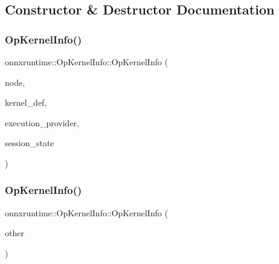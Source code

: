 \subsection{Constructor \& Destructor Documentation}
\mbox{\label{classonnxruntime_1_1OpKernelInfo_a6f4103663e7050bfe536c53526e42438}} 
\subsubsection{\texorpdfstring{Op\+Kernel\+Info()}{OpKernelInfo()}\hspace{0.1cm}{\footnotesize\ttfamily [1/2]}}
{\footnotesize\ttfamily onnxruntime\+::\+Op\+Kernel\+Info\+::\+Op\+Kernel\+Info (\begin{DoxyParamCaption}\item[{const \mbox{\hyperlink{classonnxruntime_1_1Node}{onnxruntime\+::\+Node}} \&}]{node,  }\item[{const \mbox{\hyperlink{classonnxruntime_1_1KernelDef}{Kernel\+Def}} \&}]{kernel\+\_\+def,  }\item[{const \mbox{\hyperlink{classonnxruntime_1_1IExecutionProvider}{I\+Execution\+Provider}} \&}]{execution\+\_\+provider,  }\item[{const \mbox{\hyperlink{classonnxruntime_1_1SessionState}{Session\+State}} \&}]{session\+\_\+state }\end{DoxyParamCaption})\hspace{0.3cm}{\ttfamily [explicit]}}

\mbox{\label{classonnxruntime_1_1OpKernelInfo_a36d5960e8efcd27e25f92006da9c04e4}} 
\subsubsection{\texorpdfstring{Op\+Kernel\+Info()}{OpKernelInfo()}\hspace{0.1cm}{\footnotesize\ttfamily [2/2]}}
{\footnotesize\ttfamily onnxruntime\+::\+Op\+Kernel\+Info\+::\+Op\+Kernel\+Info (\begin{DoxyParamCaption}\item[{const \mbox{\hyperlink{classonnxruntime_1_1OpKernelInfo}{Op\+Kernel\+Info}} \&}]{other }\end{DoxyParamCaption})}



